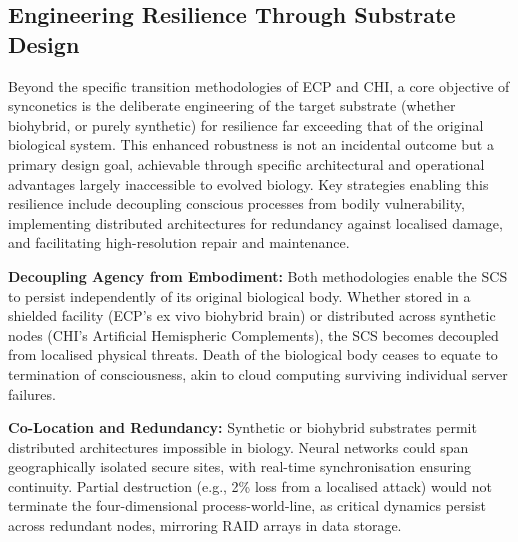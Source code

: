 \documentclass[10pt]{article}
\begin{document}
\begin{sloppypar}
  \subsection{Engineering Resilience Through Substrate Design}
  \label{sec:engineering-resilience}

  Beyond the specific transition methodologies of ECP and CHI, a core objective of synconetics is the deliberate engineering of the target substrate (whether biohybrid, or purely synthetic) for resilience far exceeding that of the original biological system. This enhanced robustness is not an incidental outcome but a primary design goal, achievable through specific architectural and operational advantages largely inaccessible to evolved biology. Key strategies enabling this resilience include decoupling conscious processes from bodily vulnerability, implementing distributed architectures for redundancy against localised damage, and facilitating high-resolution repair and maintenance.


  \textbf{Decoupling Agency from Embodiment:} Both methodologies enable the SCS to persist independently of its original biological body. Whether stored in a shielded facility (ECP’s ex vivo biohybrid brain) or distributed across synthetic nodes (CHI’s Artificial Hemispheric Complements), the SCS becomes decoupled from localised physical threats. Death of the biological body ceases to equate to termination of consciousness, akin to cloud computing surviving individual server failures.

  \textbf{Co-Location and Redundancy:} Synthetic or biohybrid substrates permit distributed architectures impossible in biology. Neural networks could span geographically isolated secure sites, with real-time synchronisation ensuring continuity. Partial destruction (e.g., 2\% loss from a localised attack) would not terminate the four-dimensional process-world-line, as critical dynamics persist across redundant nodes, mirroring RAID arrays in data storage.


\end{sloppypar}
\end{document}
